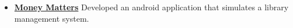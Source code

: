 \begin{resume}
\begin{itemize}
\item \textbf{\href{https://github.com/dip-kush/Money-Matters}{\textbf{Money Matters}}}
Developed an android application that simulates a library management system.

\end{itemize}








 






\end{resume}
